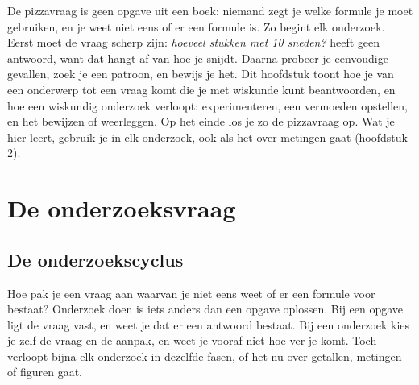 De pizzavraag is geen opgave uit een boek: niemand zegt je welke formule je moet gebruiken, en je weet niet eens of er een formule is. Zo begint elk onderzoek. Eerst moet de vraag scherp zijn: \textit{hoeveel stukken met 10 sneden?} heeft geen antwoord, want dat hangt af van hoe je snijdt. Daarna probeer je eenvoudige gevallen, zoek je een patroon, en bewijs je het. Dit hoofdstuk toont hoe je van een onderwerp tot een vraag komt die je met wiskunde kunt beantwoorden, en hoe een wiskundig onderzoek verloopt: experimenteren, een vermoeden opstellen, en het bewijzen of weerleggen. Op het einde los je zo de pizzavraag op. Wat je hier leert, gebruik je in elk onderzoek, ook als het over metingen gaat (hoofdstuk 2).

\begin{oefeningen}[Start]

\end{oefeningen}

\section{De onderzoeksvraag}

\subsection{De onderzoekscyclus}

Hoe pak je een vraag aan waarvan je niet eens weet of er een formule voor bestaat? Onderzoek doen is iets anders dan een opgave oplossen. Bij een opgave ligt de vraag vast, en weet je dat er een antwoord bestaat. Bij een onderzoek kies je zelf de vraag en de aanpak, en weet je vooraf niet hoe ver je komt. Toch verloopt bijna elk onderzoek in dezelfde fasen, of het nu over getallen, metingen of figuren gaat.

